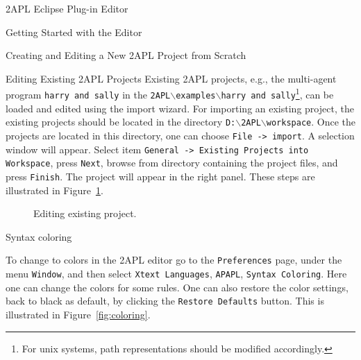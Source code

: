 \begin{chapter}{2APL Eclipse Plug-in Editor}
\begin{section}{Getting Started with the Editor}
\begin{subsection}{Creating and Editing a New 2APL Project from Scratch}
\begin{subsection}{Editing Existing 2APL Projects}
Existing 2APL projects, e.g., the multi-agent program {\tt harry and
sally} in the {\tt 2APL$\backslash$examples$\backslash$harry and
sally}\footnote{For unix systems, path representations should be
modified accordingly.}, can be loaded and edited using the import
wizard. For importing an existing project, the existing projects
should be located in the directory
\texttt{D:$\backslash$2APL$\backslash$workspace}. Once the projects
are located in this directory, one can choose {\tt File -> import}.
A selection window will appear. Select item {\tt General -> Existing
Projects into Workspace}, press {\tt Next}, browse from directory
containing the project files, and press {\tt Finish}. The project
will appear in the right panel. These steps are illustrated in
Figure~\ref{fig:existingproject}.
    \begin{figure}[h]
            \begin{center}
            \end{center}
        \begin{minipage}{0.5\linewidth}
            \begin{center}
            \end{center}
        \end{minipage}
        \hspace{.5cm}
        \begin{minipage}{0.5\linewidth}
            \begin{center}
            \end{center}
        \end{minipage}
        \caption{Editing existing project.}\label{fig:existingproject}
    \end{figure}
\end{subsection}

\end{subsection}

\end{section}


\begin{section}{Syntax coloring}

To change to colors in the 2APL editor go to the
\texttt{Preferences} page, under the menu \texttt{Window}, and then
select \texttt{Xtext Languages}, \texttt{APAPL}, \texttt{Syntax
Coloring}. Here one can change the colors for some rules. One can
also restore the color settings, back to black as default, by
clicking the \texttt{Restore Defaults} button. This is illustrated
in Figure~\ref{fig:coloring}.


\end{section}
\end{chapter}
